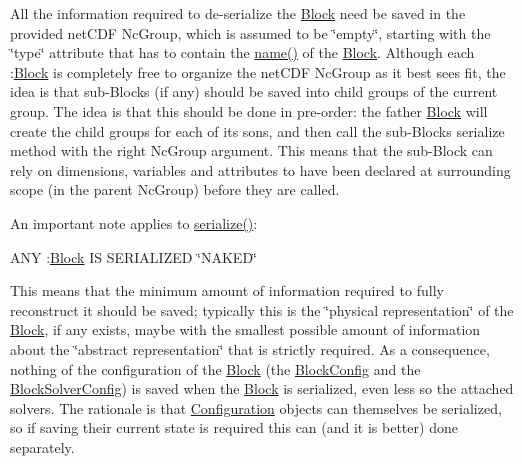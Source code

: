 All the information required to de-\/serialize the \mbox{\hyperlink{class_s_m_spp__di__unipi__it_1_1_block}{Block}} need be saved in the provided net\+C\+DF Nc\+Group, which is assumed to be \char`\"{}empty\char`\"{}, starting with the \char`\"{}type\char`\"{} attribute that has to contain the \mbox{\hyperlink{class_s_m_spp__di__unipi__it_1_1_block_a738e9dfd6e00507da219e4bd5a3f6be9}{name()}} of the \mbox{\hyperlink{class_s_m_spp__di__unipi__it_1_1_block}{Block}}. Although each \+:\mbox{\hyperlink{class_s_m_spp__di__unipi__it_1_1_block}{Block}} is completely free to organize the net\+C\+DF Nc\+Group as it best sees fit, the idea is that sub-\/\+Blocks (if any) should be saved into child groups of the current group. The idea is that this should be done in pre-\/order\+: the father \mbox{\hyperlink{class_s_m_spp__di__unipi__it_1_1_block}{Block}} will create the child groups for each of its sons, and then call the sub-\/\+Block\textquotesingle{}s serialize method with the right Nc\+Group argument. This means that the sub-\/\+Block can rely on dimensions, variables and attributes to have been declared at surrounding scope (in the parent Nc\+Group) before they are called.

An important note applies to \mbox{\hyperlink{class_s_m_spp__di__unipi__it_1_1_m_c_f_block_a1b39d46ae5259d58a1a1ed05af6c344d}{serialize()}}\+:


\begin{DoxyItemize}
\item A\+NY \+:\mbox{\hyperlink{class_s_m_spp__di__unipi__it_1_1_block}{Block}} IS S\+E\+R\+I\+A\+L\+I\+Z\+ED \char`\"{}\+N\+A\+K\+E\+D\char`\"{}

This means that the minimum amount of information required to fully reconstruct it should be saved; typically this is the \char`\"{}physical
  representation\char`\"{} of the \mbox{\hyperlink{class_s_m_spp__di__unipi__it_1_1_block}{Block}}, if any exists, maybe with the smallest possible amount of information about the \char`\"{}abstract representation\char`\"{} that is strictly required. As a consequence, nothing of the configuration of the \mbox{\hyperlink{class_s_m_spp__di__unipi__it_1_1_block}{Block}} (the \mbox{\hyperlink{class_s_m_spp__di__unipi__it_1_1_block_config}{Block\+Config}} and the \mbox{\hyperlink{class_s_m_spp__di__unipi__it_1_1_block_solver_config}{Block\+Solver\+Config}}) is saved when the \mbox{\hyperlink{class_s_m_spp__di__unipi__it_1_1_block}{Block}} is serialized, even less so the attached solvers. The rationale is that \mbox{\hyperlink{class_s_m_spp__di__unipi__it_1_1_configuration}{Configuration}} objects can themselves be serialized, so if saving their current state is required this can (and it is better) done separately.
\end{DoxyItemize}

